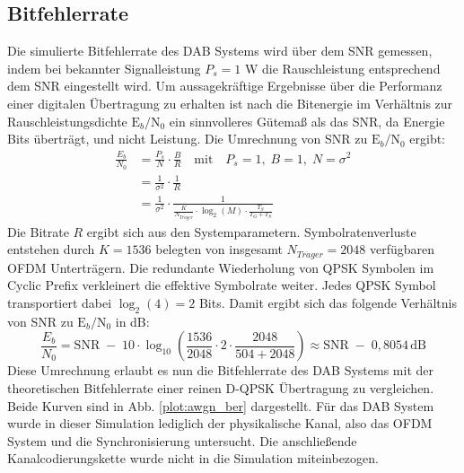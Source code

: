 \subsection{Bitfehlerrate}
Die simulierte Bitfehlerrate des DAB Systems wird über dem SNR gemessen, indem bei bekannter Signalleistung $P_s = 1$ W die Rauschleistung entsprechend dem SNR eingestellt wird. Um aussagekräftige Ergebnisse über die Performanz einer digitalen Übertragung zu erhalten ist nach \cite{snr:sklar2001digital} die Bitenergie im Verhältnis zur Rauschleistungsdichte $\text{E}_b/\text{N}_0$ ein sinnvolleres Gütemaß als das SNR, da Energie Bits überträgt, und nicht Leistung.
Die Umrechnung von SNR zu $\text{E}_b/\text{N}_0$ ergibt:
\begin{equation}
\begin{aligned}
\frac{E_b}{N_0} &= \frac{P_s}{N} \cdot \frac{B}{R} \quad \text{mit} \quad P_s=1,\; B=1,\; N=\sigma^2 \\
&= \frac{1}{\sigma^2} \cdot \frac{1}{R} \\
&= \frac{1}{\sigma^2} \cdot \frac{1}{\frac{K}{N_{Tr\ddot{a}ger}} \cdot \log_2 (M) \cdot \frac{T_S}{T_G+T_S}}
\end{aligned}
\end{equation}
Die Bitrate $R$ ergibt sich aus den Systemparametern. Symbolratenverluste entstehen durch $K=1536$ belegten von insgesamt $N_{Tr\ddot{a}ger}=2048$ verfügbaren OFDM Unterträgern. Die redundante Wiederholung von QPSK Symbolen im Cyclic Prefix verkleinert die effektive Symbolrate weiter. Jedes QPSK Symbol transportiert dabei $\log_2 (4) = 2$ Bits. Damit ergibt sich das folgende Verhältnis von SNR zu $\text{E}_b/\text{N}_0$ in dB:
\begin{equation}
\frac{E_b}{N_0} = \text{SNR} \; - \; 10\cdot \log_{10} \left(\frac{1536}{2048} \cdot 2 \cdot \frac{2048}{504+2048} \right) \approx \text{SNR} \; - \; 0,8054\, \text{dB}
\end{equation}
Diese Umrechnung erlaubt es nun die Bitfehlerrate des DAB Systems mit der theoretischen Bitfehlerrate einer reinen D-QPSK Übertragung zu vergleichen. Beide Kurven sind in Abb. \ref{plot:awgn_ber} dargestellt. Für das DAB System wurde in dieser Simulation lediglich der physikalische Kanal, also das OFDM System und die Synchronisierung untersucht. Die anschließende Kanalcodierungskette wurde nicht in die Simulation miteinbezogen. 

